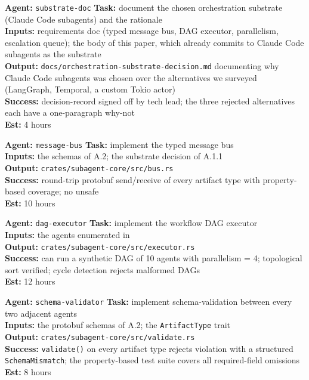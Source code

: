 \documentclass[12pt]{article}
\theoremstyle{definition}
\theoremstyle{remark}
\newenvironment{tasklist}{%
  \begingroup\raggedright
  \begin{description}[style=nextline, leftmargin=1.4cm, itemsep=0.4em]
}{%
  \end{description}
  \endgroup
}
\begin{document}
\begin{tasklist}
\item[\textbf{Task A.1.1}] \textbf{Agent:} \texttt{substrate-doc} \quad
  \textbf{Task:} document the chosen orchestration substrate (Claude
  Code subagents) and the rationale\\
  \textbf{Inputs:} requirements doc (typed message bus, DAG executor,
  parallelism, escalation queue); the body of this paper, which already
  commits to Claude Code subagents as the substrate\\
  \textbf{Output:} \texttt{docs/orchestration-substrate-decision.md}
  documenting why Claude Code subagents was chosen over the
  alternatives we surveyed (LangGraph, Temporal, a custom Tokio
  actor)\\
  \textbf{Success:} decision-record signed off by tech lead; the three
  rejected alternatives each have a one-paragraph why-not\\
  \textbf{Est:} 4 hours

\item[\textbf{Task A.1.2}] \textbf{Agent:} \texttt{message-bus} \quad
  \textbf{Task:} implement the typed message bus\\
  \textbf{Inputs:} the schemas of A.2; the substrate decision of A.1.1\\
  \textbf{Output:} \texttt{crates/subagent-core/src/bus.rs}\\
  \textbf{Success:} round-trip protobuf send/receive of every artifact
  type with property-based coverage; no unsafe\\
  \textbf{Est:} 10 hours

\item[\textbf{Task A.1.3}] \textbf{Agent:} \texttt{dag-executor} \quad
  \textbf{Task:} implement the workflow DAG executor\\
  \textbf{Inputs:} the agents enumerated in
  \\
  \textbf{Output:} \texttt{crates/subagent-core/src/executor.rs}\\
  \textbf{Success:} can run a synthetic DAG of 10 agents with
  parallelism = 4; topological sort verified; cycle detection rejects
  malformed DAGs\\
  \textbf{Est:} 12 hours

\item[\textbf{Task A.1.4}] \textbf{Agent:} \texttt{schema-validator} \quad
  \textbf{Task:} implement schema-validation between every two
  adjacent agents\\
  \textbf{Inputs:} the protobuf schemas of A.2; the
  \texttt{ArtifactType} trait\\
  \textbf{Output:} \texttt{crates/subagent-core/src/validate.rs}\\
  \textbf{Success:} \texttt{validate()} on every artifact type rejects
  violation with a structured \texttt{SchemaMismatch}; the
  property-based test suite covers all required-field omissions\\
  \textbf{Est:} 8 hours


\end{tasklist}
\end{document}
